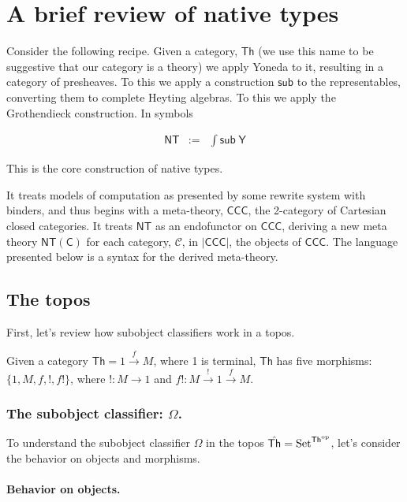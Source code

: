 \section{A brief review of native types}
Consider the following recipe. Given a category, $\mathsf{Th}$ (we use this name to be suggestive that our category is a theory) we apply Yoneda
to it, resulting in a category of presheaves. To this we apply a
construction $\mathsf{sub}$ to the representables, converting them to
complete Heyting algebras. To this we apply the Grothendieck
construction. In symbols

\begin{eqnarray}
  \mathsf{NT} & := & \int \mathsf{sub} \; \mathsf{Y} \nonumber
\end{eqnarray}

This is the core construction of native types.

It treats models of computation as presented by some rewrite system
with binders, and thus begins with a meta-theory, $\mathsf{CCC}$, the
2-category of Cartesian closed categories. It treats $\mathsf{NT}$ as
an endofunctor on $\mathsf{CCC}$, deriving a new meta theory
$\mathsf{NT(C)}$ for each category, $\mathcal{C}$, in $\mathsf{|CCC|}$, the
objects of $\mathsf{CCC}$. The language presented below is a syntax
for the derived meta-theory.

\subsection{The topos}

First, let's review how subobject classifiers work in a topos. 

Given a category $\mathsf{Th} = 1 \xrightarrow{f} M$, where 1 is terminal, $\mathsf{Th}$ has five morphisms: $\{1, M, f, !, f!\}$, where $!\colon M \to 1$ and $f!\colon M \xrightarrow{!} 1 \xrightarrow{f} M.$

\subsubsection{The subobject classifier: $\Omega$.}

To understand the subobject classifier $\Omega$ in the topos $\hat{\mathsf{Th}} = {\rm Set}^{\mathsf{Th}^{\rm op}}$, let's consider the behavior on objects and morphisms.

\paragraph{Behavior on objects.}

